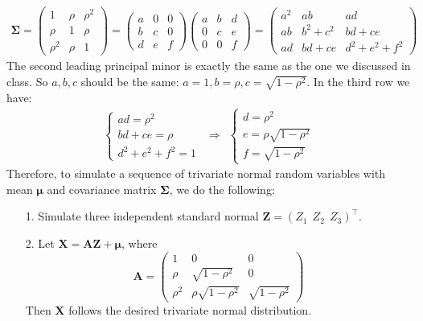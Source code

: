 \documentclass[11pt]{article}
\begin{document}
    \begin{equation}
    \begin{split}
        \bm{\Sigma} = \begin{pmatrix}
            1 & \rho & \rho^2 \\
            \rho & 1 & \rho \\
            \rho^2 & \rho & 1
        \end{pmatrix} = \begin{pmatrix}
            a & 0 & 0\\
            b & c & 0\\
            d & e & f
        \end{pmatrix}\begin{pmatrix}
            a & b & d\\
            0 & c & e\\
            0 & 0 & f
        \end{pmatrix} = \begin{pmatrix}
            a^2 & ab & ad \\
            ab & b^2+c^2 & bd+ce \\
            ad & bd+ce & d^2+e^2 + f^2
        \end{pmatrix}
    \end{split}
\end{equation}
The second leading principal minor is exactly the same as the one we discussed in class. So $a,b,c$ should be the same: $a=1, b=\rho, c=\sqrt{1-\rho^2}$. In the third row we have: 
\begin{equation}
    \begin{split}
    \begin{cases}
        ad = \rho^2 \\
        bd+ce = \rho \\
        d^2+e^2+f^2 = 1
    \end{cases} ~~ \Rightarrow ~~
    \begin{cases}
     d = \rho^2 \\
     e = \rho\sqrt{1-\rho^2} \\
     f = \sqrt{1-\rho^2}
    \end{cases}
    \end{split}
\end{equation}
Therefore, to simulate a sequence of trivariate normal random variables with mean $\bm{\mu}$ and covariance matrix $\bm{\Sigma}$, we do the following:
\begin{itemize}
    \item[1.] Simulate three independent standard normal $\bm{Z} = (Z_1~~Z_2~~Z_3)^{\top}$.
    \item[2.] Let $\bm{X}=\bm{AZ} + \bm{\mu}$, where
    $$
    \bm{A} = \begin{pmatrix}
        1 & 0 & 0\\
        \rho & \sqrt{1-\rho^2} & 0\\
        \rho^2 & \rho\sqrt{1-\rho^2} & \sqrt{1-\rho^2}
    \end{pmatrix}
    $$
    Then $\bm{X}$ follows the desired trivariate normal distribution.
\end{itemize}
\end{document}
